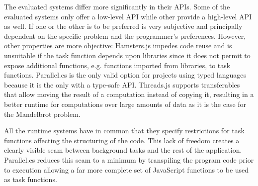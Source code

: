 The evaluated systems differ more significantly in their APIs. Some of the evaluated systems only offer a low-level API while other provide a high-level API as well. If one or the other is to be preferred is very subjective and principally dependent on the specific problem and the programmer's preferences. However, other properties are more objective: Hamsters.js impedes code reuse and is unsuitable if the task function depends upon libraries since it does not permit to expose additional functions, e.g. functions imported from libraries, to task functions. Parallel.es is the only valid option for projects using typed languages because it is the only with a type-safe API. Threads.js supports transferables that allow moving the result of a computation instead of copying it, resulting in a better runtime for computations over large amounts of data as it is the case for the Mandelbrot problem.


All the runtime systems have in common that they specify restrictions for task functions affecting the structuring of the code. This lack of freedom creates a clearly visible seam between background tasks and the rest of the application. Parallel.es reduces this seam to a minimum by transpiling the program code prior to execution allowing a far more complete set of JavaScript functions to be used as task functions.
